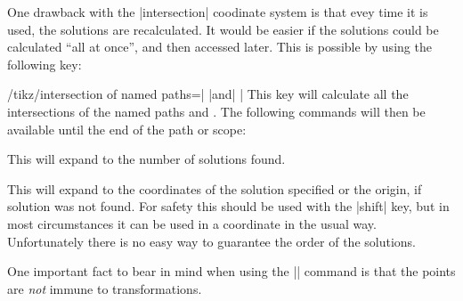   One drawback with the |intersection| coodinate system is that
  evey time it is used, the solutions are recalculated. It would be
  easier if the solutions could be calculated ``all at once'', and
  then accessed later. This is possible by using the following key:
  
\begin{key}{/tikz/intersection of named paths=| |and| |}
  This key will calculate all the intersections of the named paths
   and . The following commands will then
  be available until the end of the path or scope:

\begin{command}{\solutions}
  This will expand to the number of solutions found.
\end{command}

\begin{command}{\solution{}}
  This will expand to the coordinates of the solution specified or the 
  origin, if solution  was not found. For safety this 
  should be used with the |shift| key, but in most circumstances it 
  can be used in a coordinate in the usual way.
  Unfortunately there is no easy way to guarantee the order of the
  solutions.
\end{command}

  

\begin{codeexample}[]
\end{codeexample}

   One important fact to bear in mind when using the |\solution|
   command is that the points are \emph{not} immune to transformations.

\begin{codeexample}[]
%
\end{codeexample}
   
\end{key}


